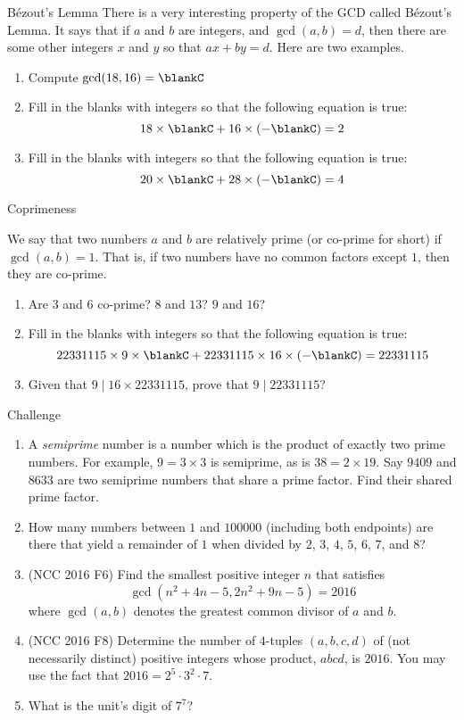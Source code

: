 \documentclass[12pt,letterpaper]{article}
\begin{document}
\begin{problem}{B\'ezout's Lemma}
 There is a very interesting property of the GCD called B\'ezout's Lemma. It
 says that if $a$ and $b$ are integers, and $\gcd(a, b) = d$, then there are
 some other integers $x$ and $y$ so that $ax + by = d$. Here are two examples.

 \begin{enumerate}
  \item Compute $\gcd(18, 16) = \blankC$
  \item Fill in the blanks with integers so that the following equation is true:
  \[ 18 \times \blankC + 16 \times (- \blankC) = 2 \]
  \item Fill in the blanks with integers so that the following equation is true:
  \[ 20 \times \blankC + 28 \times (- \blankC) = 4 \]
 \end{enumerate}
\end{problem}

\begin{problem}{Coprimeness}

 We say that two numbers $a$ and $b$ are relatively prime (or co-prime for
 short) if $\gcd(a, b) = 1$. That is, if two numbers have no common factors
 except $1$, then they are co-prime.

 \begin{enumerate}
  \item Are $3$ and $6$ co-prime? \(8\) and \(13\)? \(9\) and \(16\)?
  \item Fill in the blanks with integers so that the following equation is true:
  \[ 22331115 \times 9 \times \blankC + 22331115 \times 16 \times (-\blankC) =
  22331115 \]
  \item Given that $9 \mid 16\times22331115$, prove that $9\mid22331115$?
 \end{enumerate}
\end{problem}

\begin{problem}{Challenge}
  \begin{enumerate}
    \item
 A \emph{semiprime} number is a number which is the product of exactly two
 prime numbers. For example, $9=3\times3$ is semiprime, as is $38=2\times19$.
 Say $9409$ and $8633$ are two semiprime numbers that share a prime factor.
 Find their shared prime factor.
 \item How many numbers between $1$ and $100000$ (including both endpoints)
 are there that yield a remainder of $1$ when divided by $2$, $3$, $4$, $5$,
 $6$, $7$, and $8$?
 \item (NCC 2016 F6) Find the smallest positive integer \(n\) that satisfies \[
 \gcd(n^2 + 4n - 5, 2n^2 + 9n - 5) = 2016 \] where \(\gcd(a, b)\) denotes the
 greatest common divisor of \(a\) and \(b\).
 \item (NCC 2016 F8) Determine the number of \(4\)-tuples \((a, b, c, d)\) of
(not necessarily distinct) positive integers whose product, \(abcd\), is
\(2016\). You may use the fact that \(2016 = 2^5 \cdot 3^2 \cdot 7\).
  \item What is the unit's digit of \(7^7\)?
 \end{enumerate}
\end{problem}
\end{document}
